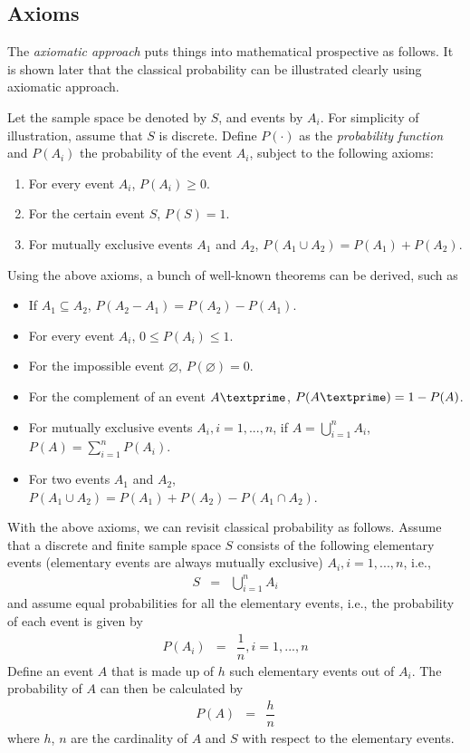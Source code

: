 \subsection{Axioms}

The \textit{axiomatic approach} puts things into mathematical prospective as follows. It is shown later that the classical probability can be illustrated clearly using axiomatic approach.

Let the sample space be denoted by $S$, and events by $A_i$. For simplicity of illustration, assume that $S$ is discrete. Define $P(\cdot)$ as the \textit{probability function} and $P(A_i)$ the probability of the event $A_i$, subject to the following axioms:
\begin{enumerate}
  \item For every event $A_i$, $P(A_i)\geq 0$.
  \item For the certain event $S$, $P(S)=1$.
  \item For mutually exclusive events $A_1$ and $A_2$, $P\left(A_1\cup A_2\right) = P(A_1)+P(A_2)$.
\end{enumerate}

Using the above axioms, a bunch of well-known theorems can be derived, such as
\begin{itemize}
  \item If $A_1 \subseteq A_2$, $P(A_2-A_1) = P(A_2)-P(A_1)$.
  \item For every event $A_i$, $0\leq P(A_i) \leq 1$.
  \item For the impossible event $\varnothing$, $P(\varnothing)=0$.
  \item For the complement of an event $A\textprime$, $P(A\textprime)=1-P(A)$.
  \item For mutually exclusive events $A_i, i=1,...,n$, if $A = \bigcup_{i=1}^{n} A_i$, $P(A) = \sum_{i=1}^{n}P(A_i)$.
  \item For two events $A_1$ and $A_2$, $P\left(A_1\cup A_2\right) = P(A_1)+P(A_2)-P\left(A_1\cap A_2\right)$.
\end{itemize}

With the above axioms, we can revisit classical probability as follows. Assume that a discrete and finite sample space $S$ consists of the following elementary events (elementary events are always mutually exclusive) $A_i, i=1,...,n$, i.e.,
\begin{eqnarray}
  S &=& \bigcup_{i=1}^{n} A_i \nonumber
\end{eqnarray}
and assume equal probabilities for all the elementary events, i.e., the probability of each event is given by
\begin{eqnarray}
  P(A_i) &=& \dfrac{1}{n}, i=1,...,n \nonumber
\end{eqnarray}
Define an event $A$ that is made up of $h$ such elementary events out of $A_i$. The probability of $A$ can then be calculated by
\begin{eqnarray}
  P(A) &=& \dfrac{h}{n} \nonumber
\end{eqnarray}
where $h$, $n$ are the cardinality of $A$ and $S$ with respect to the elementary events.


